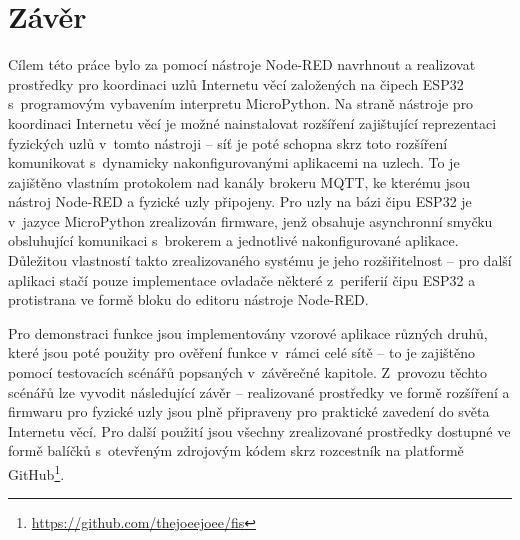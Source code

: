 \chapter{Závěr}
\label{ch:zaver}

Cílem této práce bylo za pomocí nástroje Node-RED navrhnout a realizovat prostředky pro koordinaci uzlů Internetu věcí
založených na čipech ESP32 s~programovým vybavením interpretu MicroPython.
Na straně nástroje pro koordinaci Internetu věcí je možné nainstalovat rozšíření zajištující reprezentaci fyzických
uzlů v~tomto nástroji
-- síť je poté schopna skrz toto rozšíření komunikovat s~dynamicky nakonfigurovanými aplikacemi na uzlech.
To je zajištěno vlastním protokolem nad kanály brokeru MQTT, ke kterému jsou nástroj Node-RED a fyzické uzly připojeny.
Pro uzly na bázi čipu ESP32 je v~jazyce MicroPython zrealizován firmware, jenž obsahuje asynchronní smyčku
obsluhující komunikaci s~brokerem a jednotlivé nakonfigurované aplikace.
Důležitou vlastností takto zrealizovaného systému je jeho rozšiřitelnost -- pro další aplikaci stačí pouze implementace
ovladače některé z~periferií čipu ESP32 a protistrana ve formě bloku do editoru nástroje Node-RED.

Pro demonstraci funkce jsou implementovány vzorové aplikace různých druhů, které jsou poté použity pro ověření
funkce v~rámci celé sítě -- to je zajištěno pomocí testovacích scénářů popsaných v~závěrečné kapitole.
Z~provozu těchto scénářů lze vyvodit následující závěr -- realizované prostředky ve formě rozšíření a firmwaru pro
fyzické uzly jsou plně připraveny pro praktické zavedení do světa Internetu věcí.
Pro další použití jsou všechny zrealizované prostředky dostupné ve formě balíčků s~otevřeným zdrojovým kódem skrz
rozcestník na platformě GitHub\footnote{\url{https://github.com/thejoeejoee/fis}}.